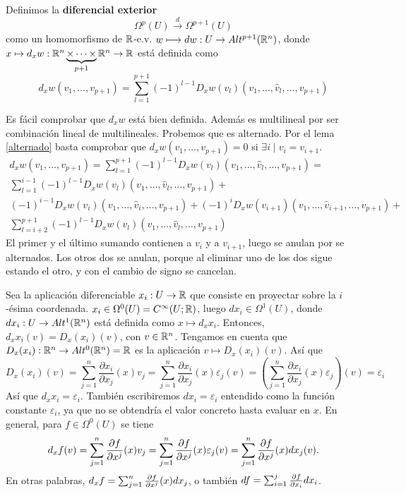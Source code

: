 \documentclass[CV.tex]{subfiles}
\begin{document}
\begin{defi}
Definimos la \textbf{diferencial exterior}
\[
\Omega^p(U)\overset{d}{\longrightarrow} \Omega^{p+1}(U)
\]
como un homomorfismo de $\mathbb{R}$-e.v. $w\longmapsto dw:U\to Alt^{p+1}(\mathbb{R}^n)$, donde $x\mapsto d_xw:\mathbb{R}^n\underbrace{\times\dots \times}_{p+1}\mathbb{R}^n\to \mathbb{R}$ está definida como
\[
d_xw(v_1,\dots, v_{p+1})=\sum_{l=1}^{p+1}(-1)^{l-1}D_xw(v_l)(v_1,\dots, \hat{v}_l,\dots, v_{p+1})
\]
\end{defi}
Es fácil comprobar que $d_xw$ está bien definida. Además es multilineal por ser combinación lineal de multilineales. Probemos que es alternado. Por el lema \ref{alternado} basta comprobar que $d_xw(v_1,\dots, v_{p+1})=0$ si $\exists i\mid v_i=v_{i+1}$. 
\begin{gather*}
d_xw(v_1,\dots, v_{p+1})=\sum_{l=1}^{p+1}(-1)^{l-1}D_xw(v_l)(v_1,\dots, \hat{v}_l,\dots, v_{p+1})=\\
\sum_{l=1}^{i-1}(-1)^{l-1}D_xw(v_l)(v_1,\dots, \hat{v}_l,\dots, v_{p+1})+\\
(-1)^{i-1}D_xw(v_i)(v_1,\dots, \hat{v}_i,\dots, v_{p+1})+(-1)^{i}D_xw(v_{i+1})(v_1,\dots, \hat{v}_{i+1},\dots, v_{p+1})+\\
\sum_{l=i+2}^{p+1}(-1)^{l-1}D_xw(v_l)(v_1,\dots, \hat{v}_l,\dots, v_{p+1})
\end{gather*}
El primer y el último sumando contienen a $v_i$ y a $v_{i+1}$, luego se anulan por se alternados. Los otros dos se anulan, porque al eliminar uno de los dos sigue estando el otro, y con el cambio de signo se cancelan.

\begin{ej}
Sea la aplicación diferenciable $x_i:U\to\mathbb{R}$ que consiste en proyectar sobre la $i$-ésima coordenada. $x_i\in \Omega^0(U)=C^{\infty}(U;\mathbb{R})$, luego $dx_i\in\Omega^1(U)$, donde $dx_i:U\to Alt^1(\mathbb{R}^n)$ está definida como $x\mapsto d_x x_i$. Entonces, $d_x x_i(v)=D_x(x_i)(v)$, con $v\in\mathbb{R}^n$. Tengamos en cuenta que $D_x(x_i):\mathbb{R}^n\to Alt^0(\mathbb{R}^n)=\mathbb{R}$ es la aplicación $v\mapsto D_x(x_i)(v)$. Así que
\[
D_x(x_i)(v)=\sum_{j=1}^n\frac{\partial x_i}{\partial x_j}(x)v_j=\sum_{j=1}^n\frac{\partial x_i}{\partial x_j}(x)\varepsilon_j(v)=\left(\sum_{j=1}^n\frac{\partial x_i}{\partial x_j}(x)\varepsilon_j\right)(v)= \varepsilon_i
\]
Así que $d_xx_i=\varepsilon_i$. También escribiremos $dx_i=\varepsilon_i$ entendido como la función constante $\varepsilon_i$, ya que no se obtendría el valor concreto hasta evaluar en $x$. En general, para $f\in\Omega^0(U)$ se tiene
\[
d_xf(v)=\sum_{j=1}^n\frac{\partial f}{\partial x^j}(x)v_j=\sum_{j=1}^n\frac{\partial f}{\partial x^j}(x)\varepsilon_j(v)=\sum_{j=1}^n\frac{\partial f}{\partial x^j}(x)dx_j(v).
\]
En otras palabras, $d_xf=\sum_{j=1}^n\frac{\partial f}{\partial x^j}(x)dx_j$, o también $df=\sum_{i=1}^j\frac{\partial f}{\partial x_i}dx_i$. 
\end{ej}
\end{document}
